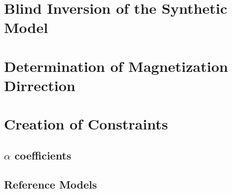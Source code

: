 
\section{Blind Inversion of the Synthetic Model}
\label{sec:Blind Inversion of the Synthetic Mode1:ElPoma}


\section{Determination of Magnetization Dirrection}
\label{sec:Determination of Magnetization Dirrection}

%
%

\section{Creation of Constraints}
\label{sec:Creation of Constraints:ElPoma}

\subsection{$\alpha$ coefficients}
\label{sec:alpha coefficients:ElPoma}

%

\subsection{Reference Models}
\label{sec:Reference Models:ElPoma}

%
%
%
%


